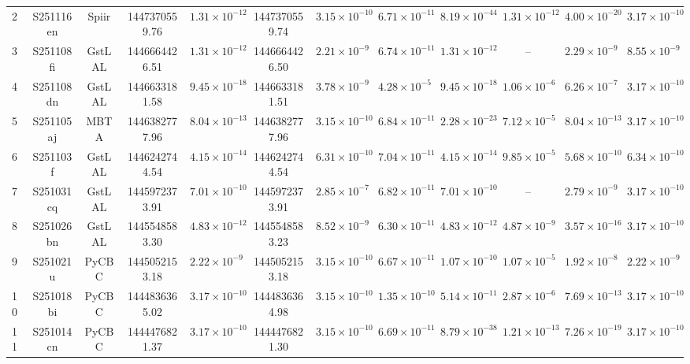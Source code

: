 \begin{refsection}
\begin{table}[ht]
{\begin{tabular}{!{\vrule width 1pt}lccccccccccc!{\vrule width 1pt}}
2 & S251116en & Spiir & 1447370559.76 & $1.31 \times 10^{-12}$ & 1447370559.74 & $3.15 \times 10^{-10}$ & $6.71 \times 10^{-11}$ & $8.19 \times 10^{-44}$ & $1.31 \times 10^{-12}$ & $4.00 \times 10^{-20}$ & $3.17 \times 10^{-10}$ \\
3 & S251108fi & GstLAL & 1446664426.51 & $1.31 \times 10^{-12}$ & 1446664426.50 & $2.21 \times 10^{-9}$ & $6.74 \times 10^{-11}$ & $1.31 \times 10^{-12}$ & -- & $2.29 \times 10^{-9}$ & $8.55 \times 10^{-9}$ \\
4 & S251108dn & GstLAL & 1446633181.58 & $9.45 \times 10^{-18}$ & 1446633181.51 & $3.78 \times 10^{-9}$ & $4.28 \times 10^{-5}$ & $9.45 \times 10^{-18}$ & $1.06 \times 10^{-6}$ & $6.26 \times 10^{-7}$ & $3.17 \times 10^{-10}$ \\
5 & S251105aj & MBTA & 1446382777.96 & $8.04 \times 10^{-13}$ & 1446382777.96 & $3.15 \times 10^{-10}$ & $6.84 \times 10^{-11}$ & $2.28 \times 10^{-23}$ & $7.12 \times 10^{-5}$ & $8.04 \times 10^{-13}$ & $3.17 \times 10^{-10}$ \\
6 & S251103f & GstLAL & 1446242744.54 & $4.15 \times 10^{-14}$ & 1446242744.54 & $6.31 \times 10^{-10}$ & $7.04 \times 10^{-11}$ & $4.15 \times 10^{-14}$ & $9.85 \times 10^{-5}$ & $5.68 \times 10^{-10}$ & $6.34 \times 10^{-10}$ \\
7 & S251031cq & GstLAL & 1445972373.91 & $7.01 \times 10^{-10}$ & 1445972373.91 & $2.85 \times 10^{-7}$ & $6.82 \times 10^{-11}$ & $7.01 \times 10^{-10}$ & -- & $2.79 \times 10^{-9}$ & $3.17 \times 10^{-10}$ \\
8 & S251026bn & GstLAL & 1445548583.30 & $4.83 \times 10^{-12}$ & 1445548583.23 & $8.52 \times 10^{-9}$ & $6.30 \times 10^{-11}$ & $4.83 \times 10^{-12}$ & $4.87 \times 10^{-9}$ & $3.57 \times 10^{-16}$ & $3.17 \times 10^{-10}$ \\
9 & S251021u & PyCBC & 1445052153.18 & $2.22 \times 10^{-9}$ & 1445052153.18 & $3.15 \times 10^{-10}$ & $6.67 \times 10^{-11}$ & $1.07 \times 10^{-10}$ & $1.07 \times 10^{-5}$ & $1.92 \times 10^{-8}$ & $2.22 \times 10^{-9}$ \\
10 & S251018bi & PyCBC & 1444836365.02 & $3.17 \times 10^{-10}$ & 1444836364.98 & $3.15 \times 10^{-10}$ & $1.35 \times 10^{-10}$ & $5.14 \times 10^{-11}$ & $2.87 \times 10^{-6}$ & $7.69 \times 10^{-13}$ & $3.17 \times 10^{-10}$ \\
11 & S251014cn & PyCBC & 1444476821.37 & $3.17 \times 10^{-10}$ & 1444476821.30 & $3.15 \times 10^{-10}$ & $6.69 \times 10^{-11}$ & $8.79 \times 10^{-38}$ & $1.21 \times 10^{-13}$ & $7.26 \times 10^{-19}$ & $3.17 \times 10^{-10}$ \\

\end{tabular}}
\end{table}
\end{refsection}
